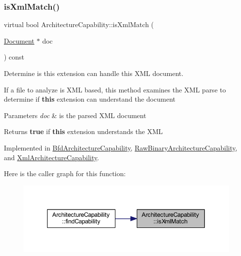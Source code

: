 \subsubsection{\texorpdfstring{isXmlMatch()}{isXmlMatch()}}
{\footnotesize\ttfamily virtual bool Architecture\+Capability\+::is\+Xml\+Match (\begin{DoxyParamCaption}\item[{\mbox{\hyperlink{class_document}{Document}} $\ast$}]{doc }\end{DoxyParamCaption}) const\hspace{0.3cm}{\ttfamily [pure virtual]}}



Determine is this extension can handle this X\+ML document. 

If a file to analyze is X\+ML based, this method examines the X\+ML parse to determine if {\bfseries{this}} extension can understand the document 
\begin{DoxyParams}{Parameters}
{\em doc} & is the parsed X\+ML document \\
\hline
\end{DoxyParams}
\begin{DoxyReturn}{Returns}
{\bfseries{true}} if {\bfseries{this}} extension understands the X\+ML 
\end{DoxyReturn}


Implemented in \mbox{\hyperlink{class_bfd_architecture_capability_aa5231740c6fb12308f8e9a31ea291cf4}{Bfd\+Architecture\+Capability}}, \mbox{\hyperlink{class_raw_binary_architecture_capability_ad26a1a35fec33c5952a3f499dc0e43db}{Raw\+Binary\+Architecture\+Capability}}, and \mbox{\hyperlink{class_xml_architecture_capability_ab834c8722ce6813e4b5cf34a207b0f52}{Xml\+Architecture\+Capability}}.

Here is the caller graph for this function\+:
\nopagebreak
\begin{figure}[H]
\begin{center}
\leavevmode
\includegraphics[width=340pt]{class_architecture_capability_a653243b342d480273e0f04f7194094b8_icgraph}
\end{center}
\end{figure}
\mbox{\label{class_architecture_capability_aa2c4dc37eac39cfe01d8ee5ec75d0c61}} 
